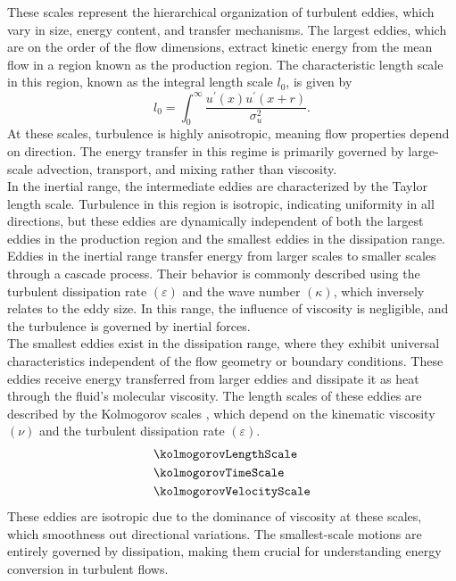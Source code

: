 These scales represent the hierarchical organization of turbulent eddies, which
vary in size, energy content, and transfer mechanisms. The largest eddies,
which are on the order of the flow dimensions, extract kinetic energy from the
mean flow in a region known as the production region. The characteristic length
scale in this region, known as the integral length scale $l_0$, is given by
\begin{equation}\label{eq:integralLenghtScale}
    l_0 = \int^{\infty}_0\frac{ u^{\prime}(x) u^{\prime}(x + r)}{\sigma^2_u}.
\end{equation}
At these scales, turbulence is highly anisotropic, meaning flow properties
depend on direction. The energy transfer in this regime is primarily governed
by large-scale advection, transport, and mixing rather than viscosity. \\

In the inertial range, the intermediate eddies are characterized by the Taylor
length scale. Turbulence in this region is isotropic, indicating uniformity in
all directions, but these eddies are dynamically independent of both the
largest eddies in the production region and the smallest eddies in the
dissipation range. Eddies in the inertial range transfer energy from larger
scales to smaller scales through a cascade process. Their behavior is commonly
described using the turbulent dissipation rate $(\varepsilon)$ and the wave
number $(\kappa)$, which inversely relates to the eddy size. In this range, the
influence of viscosity is negligible, and the turbulence is governed by
inertial forces.\\

The smallest eddies exist in the dissipation range, where they exhibit
universal characteristics independent of the flow geometry or boundary
conditions. These eddies receive energy transferred from larger eddies and
dissipate it as heat through the fluid's molecular viscosity. The length scales
of these eddies are described by the Kolmogorov scales , which depend on the
kinematic viscosity $(\nu)$ and the turbulent dissipation rate $(\varepsilon)$.
\begin{subequations}\label{eq:kolmogorovScales}
    \begin{align}
        &\kolmogorovLengthScale \label{eq:kolmogorovLength} \\
        &\kolmogorovTimeScale \label{eq:kolmogorovTime} \\
        &\kolmogorovVelocityScale  \label{eq:kolmogorovVelocity} 
    \end{align}
\end{subequations}
These eddies are isotropic due to the dominance of viscosity at these scales,
which smoothness out directional variations. The smallest-scale motions are
entirely governed by dissipation, making them crucial for understanding energy
conversion in turbulent flows.\\

